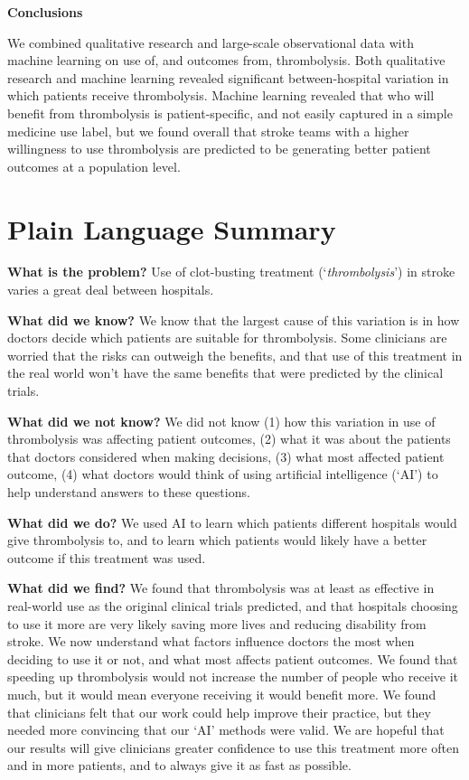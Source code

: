 \textbf{Conclusions}

We combined qualitative research and large-scale observational data with machine learning on use of, and outcomes from, thrombolysis. Both qualitative research and machine learning revealed significant between-hospital variation in which patients receive thrombolysis. Machine learning revealed that who will benefit from thrombolysis is patient-specific, and not easily captured in a simple medicine use label, but we found overall that stroke teams with a higher willingness to use thrombolysis are predicted to be generating better patient outcomes at a population level.

\section*{Plain Language Summary}

\textbf{What is the problem?} Use of clot-busting treatment (`\textit{thrombolysis}') in stroke varies a great deal between hospitals.

\textbf{What did we know?} We know that the largest cause of this variation is in how doctors decide which patients are suitable for thrombolysis. Some clinicians are worried that the risks can outweigh the benefits, and that use of this treatment in the real world won’t have the same benefits that were predicted by the clinical trials.

\textbf{What did we not know?} We did not know (1) how this variation in use of thrombolysis was affecting patient outcomes, (2) what it was about the patients that doctors considered when making decisions, (3) what most affected patient outcome, (4) what doctors would think of using artificial intelligence (`AI') to help understand answers to these questions.

\textbf{What did we do?} We used AI to learn which patients different hospitals would give thrombolysis to, and to learn which patients would likely have a better outcome if this treatment was used.

\textbf{What did we find?} We found that thrombolysis was at least as effective in real-world use as the original clinical trials predicted, and that hospitals choosing to use it more are very likely saving more lives and reducing disability from stroke. We now understand what factors influence doctors the most when deciding to use it or not, and what most affects patient outcomes. We found that speeding up thrombolysis would not increase the number of people who receive it much, but it would mean everyone receiving it would benefit more. We found that clinicians felt that our work could help improve their practice, but they needed more convincing that our ‘AI’ methods were valid. We are hopeful that our results will give clinicians greater confidence to use this treatment more often and in more patients, and to always give it as fast as possible.